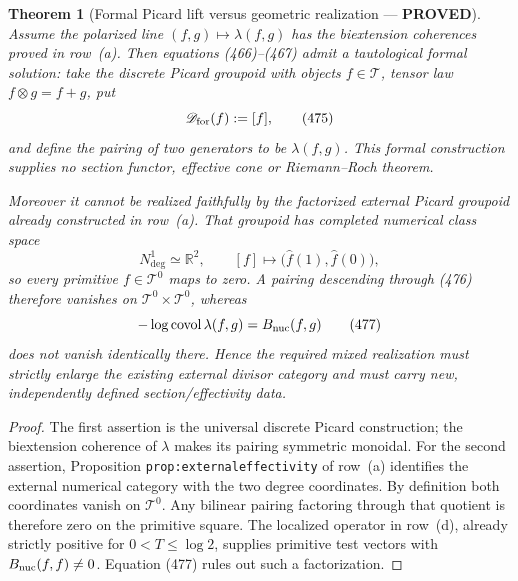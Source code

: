 \documentclass[11pt]{article}
\newtheorem{theorem}{Theorem}
\newcommand{\PROVED}{\textcolor{green!45!black}{\textbf{PROVED}}}
\begin{document}
\begin{theorem}[Formal Picard lift versus geometric realization ---
\PROVED]
Assume the polarized line \((f,g)\mapsto\lambda(f,g)\) has the biextension
coherences proved in row~(a).  Then equations (466)--(467) admit a tautological
\emph{formal} solution: take the discrete Picard groupoid with objects
\(f\in\mathcal T\), tensor law \(f\otimes g=f+g\), put
\begin{equation}
 \mathscr D_{\rm for}(f):=[f],                       \tag{475}
\end{equation}
and define the pairing of two generators to be \(\lambda(f,g)\).
This formal construction supplies no section functor, effective cone or
Riemann--Roch theorem.

Moreover it cannot be realized faithfully by the factorized external
Picard groupoid already constructed in row~(a).  That groupoid has completed
numerical class space
\begin{equation}
 N^1_{\deg}\simeq\mathbb R^2,\qquad
 [f]\longmapsto\bigl(\widehat f(1),\widehat f(0)\bigr),           \tag{476}
\end{equation}
so every primitive \(f\in\mathcal T^0\) maps to zero.  A pairing descending
through (476) therefore vanishes on
\(\mathcal T^0\times\mathcal T^0\), whereas
\begin{equation}
 -\log\operatorname{covol}\lambda(f,g)=B_{\rm nuc}(f,g)          \tag{477}
\end{equation}
does not vanish identically there.  Hence the required mixed realization
must strictly enlarge the existing external divisor category and must carry
new, independently defined section/effectivity data.
\end{theorem}

\begin{proof}
The first assertion is the universal discrete Picard construction; the
biextension coherence of \(\lambda\) makes its pairing symmetric monoidal.
For the second assertion, Proposition
\texttt{prop:externaleffectivity} of row~(a) identifies the external
numerical category with the two degree coordinates.  By definition both
coordinates vanish on \(\mathcal T^0\).  Any bilinear pairing factoring
through that quotient is therefore zero on the primitive square.  The
localized operator in row~(d), already strictly positive for
\(0<T\le\log2\), supplies primitive test vectors with
\(B_{\rm nuc}(f,f)\ne0\).  Equation (477) rules out such a factorization.
\end{proof}
\end{document}
